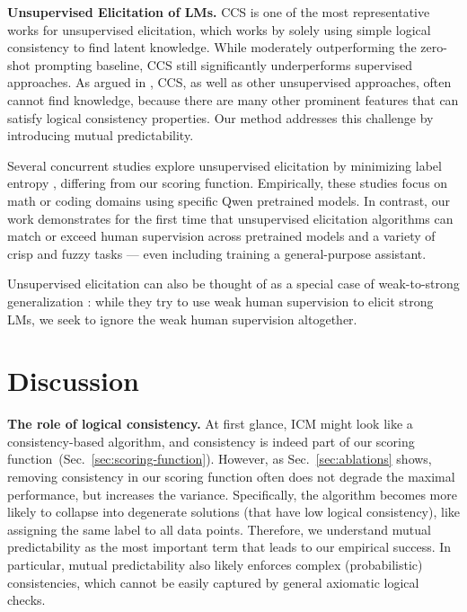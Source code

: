 \documentclass{article}
\newcommand{\ourmethod}[0]{\textsc{ICM}\xspace}
\begin{document}
\textbf{Unsupervised Elicitation of LMs.} CCS \citep{burns2022discovering} is one of the most representative works for unsupervised elicitation, which works by solely using simple logical consistency to find latent knowledge. 
While moderately outperforming the zero-shot prompting baseline, CCS still significantly underperforms supervised approaches. As argued in \citep{farquhar2023challenges}, CCS, as well as other unsupervised approaches, often cannot find knowledge, because there are many other prominent features that can satisfy logical consistency properties. Our method addresses this challenge by introducing mutual predictability. 

Several concurrent studies explore unsupervised elicitation by minimizing label entropy \citep{zhao2025learning, agarwal2025unreasonable}, differing from our scoring function. Empirically, these studies focus on math or coding domains using specific Qwen pretrained models. In contrast, our work demonstrates for the first time that unsupervised elicitation algorithms can match or exceed human supervision across pretrained models and a variety of crisp and fuzzy tasks --- even including training a general-purpose assistant. 

Unsupervised elicitation can also be thought of as a special case of weak-to-strong generalization \citep{burns2023weak, hase2024unreasonable}: while they try to use weak human supervision to elicit strong LMs, we seek to ignore the weak human supervision altogether. 

\section{Discussion}

\textbf{The role of logical consistency.} At first glance, \ourmethod might look like a consistency-based algorithm, and consistency is indeed part of our scoring function~(Sec.~\ref{sec:scoring-function}). 
However, as Sec.~\ref{sec:ablations} shows, removing consistency in our scoring function often does not degrade the maximal performance, but increases the variance. Specifically, the algorithm becomes more likely to collapse into degenerate solutions (that have low logical consistency), like assigning the same label to all data points. Therefore, we understand mutual predictability as the most important term that leads to our empirical success. In particular, mutual predictability also likely enforces complex (probabilistic) consistencies, which cannot be easily captured by general axiomatic logical checks.
\end{document}
